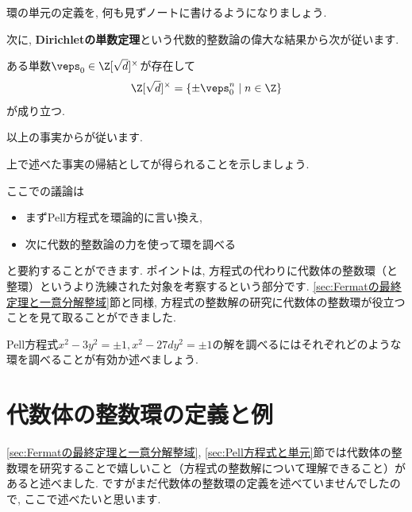 \documentclass[11pt,b5paper,oneside,titlepage,lualatex]{ltjsreport}
\begin{document}
\begin{exercise}{}{}
	環の単元の定義を, 何も見ずノートに書けるようになりましょう. 
\end{exercise}

次に, \textbf{Dirichletの単数定理}という代数的整数論の偉大な結果から次が従います. 

\begin{theorem}{}{}
	ある単数$ \veps_0 \in \Z[\sqrt{d}]^\times $が存在して
	\[
	\Z[\sqrt{d}]^\times = \{ \pm \veps_0^n \mid n \in \Z \}
	\]
	が成り立つ. 
\end{theorem}

以上の事実からが従います. 

\begin{exercise}{}{}
	上で述べた事実の帰結としてが得られることを示しましょう. 
\end{exercise}

ここでの議論は
\begin{itemize}
	\item まずPell方程式を環論的に言い換え, 
	\item 次に代数的整数論の力を使って環を調べる
\end{itemize}
と要約することができます. 
ポイントは, 方程式の代わりに代数体の整数環（と整環）というより洗練された対象を考察するという部分です. 
\ref{sec:Fermatの最終定理と一意分解整域}節と同様, 方程式の整数解の研究に代数体の整数環が役立つことを見て取ることができました. 

\begin{exercise}{}{}
	Pell方程式$ x^2 - 3y^2 = \pm 1, x^2 - 27dy^2 = \pm 1 $の解を調べるにはそれぞれどのような環を調べることが有効か述べましょう. 
\end{exercise}


\section{代数体の整数環の定義と例} \label{sec:代数体の整数環の定義と例}


\ref{sec:Fermatの最終定理と一意分解整域}, \ref{sec:Pell方程式と単元}節では代数体の整数環を研究することで嬉しいこと（方程式の整数解について理解できること）があると述べました. 
ですがまだ代数体の整数環の定義を述べていませんでしたので, ここで述べたいと思います. 
\end{document}
